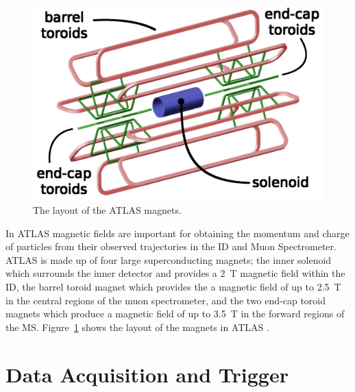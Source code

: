 \begin{figure}[!ht]
  \begin{center}
    \includegraphics[width=1\linewidth, angle=0]{figs/Detector/Magnet_schem.png}
  \end{center}
  \caption{
    The layout of the ATLAS magnets.}
  \label{fig:det-magnet_schem}
\end{figure}


In ATLAS magnetic fields are important for obtaining the momentum and charge of particles from their observed trajectories in the ID and Muon Spectrometer.
ATLAS is made up of four large superconducting magnets;
the inner solenoid which surrounds the inner detector and provides a 2~T magnetic field within the ID,
the barrel toroid magnet which provides the a magnetic field of up to 2.5~T in the central regions of the muon spectrometer,
and the two end-cap toroid magnets which produce a magnetic field of up to 3.5~T in the forward regions of the MS.
Figure~\ref{fig:det-magnet_schem} shows the layout of the magnets in ATLAS \cite{det-magnet_fig}.\\


\section{Data Acquisition and Trigger}

